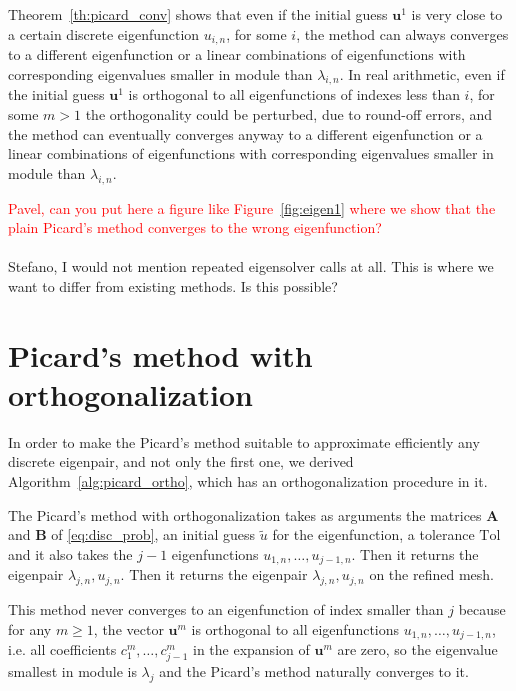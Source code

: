 \documentclass[preprint ,12pt]{elsarticle}
\begin{document}
Theorem~\ref{th:picard_conv} shows that even if the initial guess $\mathbf{u}^1$ is very close to a certain discrete eigenfunction $u_{i,n}$, for some $i$, the method can always converges to a different eigenfunction or a linear combinations of eigenfunctions with corresponding eigenvalues smaller in module than $\lambda_{i,n}$. In real arithmetic, even if the initial guess $\mathbf{u}^1$ is orthogonal to all eigenfunctions of indexes less than $i$, for some $m>1$ the orthogonality could be perturbed, due to round-off errors, and the method can eventually converges anyway to a different eigenfunction or a linear combinations of eigenfunctions with corresponding eigenvalues smaller in module than $\lambda_{i,n}$.

\textcolor{red}{Pavel, can you put here a figure like Figure~\ref{fig:eigen1} where we show that the plain Picard's method converges to the wrong eigenfunction?}\\
\\
{\red Stefano, I would not mention repeated eigensolver calls at all. This is where we want to differ from 
existing methods. Is this possible?}


\section{Picard's method with orthogonalization}

In order to make the Picard's method suitable to approximate efficiently any discrete eigenpair, and not only the first one, we derived Algorithm~\ref{alg:picard_ortho}, which has an orthogonalization procedure in it.

The Picard's method with orthogonalization takes as arguments the matrices $\mathbf{A}$ and $\mathbf{B}$ of \eqref{eq:disc_prob}, an initial guess $\tilde u$ for the eigenfunction, a tolerance $\mathrm{Tol}$and it also takes the $j-1$ eigenfunctions $u_{1,n},\dots,u_{j-1,n}$.
Then it returns the eigenpair $\lambda_{j,n},u_{j,n}$. 
Then it returns the eigenpair $\lambda_{j,n},u_{j,n}$ on the refined mesh.

This method never converges to an eigenfunction of index smaller than $j$ because for any $m\ge 1$, the vector $\mathbf{u}^m$ is orthogonal to all eigenfunctions $u_{1,n},\dots,u_{j-1,n}$, i.e. all coefficients 
$c_1^m,\dots,c_{j-1}^m$ in the expansion of $\mathbf{u}^m$ are zero, so the eigenvalue smallest in module is $\lambda_j$ and the Picard's method naturally converges to it.
\end{document}
